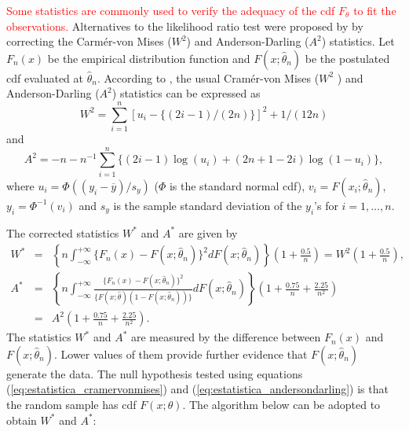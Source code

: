 \documentclass[10pt,letterpaper]{article}
\begin{document}
\textcolor{red}{Some statistics are commonly used to verify the adequacy of the cdf $F_\theta$ to fit the observations.} Alternatives to the likelihood ratio test were proposed by \cite{chen1995general} by correcting the Carm\'er-von Mises ($W^2$) and Anderson-Darling ($A^2$) statistics. Let $F_n(x)$ be the empirical distribution function and $F(x;\widehat \theta_n)$ be the postulated cdf evaluated at $\widehat \theta_n$.
According to \cite{chen1995general}, the usual Cram\'er-von Mises ($W^2$ ) and Anderson-Darling ($A^2$)
statistics can be expressed as
\begin{equation}\label{eq:w2}
W^2 = \sum_{i=1}^{n}[u_i - \{(2i-1)/(2n) \}]^2 + 1/(12n)
\end{equation}
and
\begin{equation}\label{eq:a2}
A^2 = -n - n^{-1}\sum_{i=1}^{n}\{(2i-1)\log(u_i) + (2n+1-2i)\log(1-u_i)\},
\end{equation}
where $u_i = \Phi((y_i-\overline{y})/s_y)$ ($\Phi$ is the standard normal cdf), $v_i = F(x_i; \widehat \theta_n)$, $y_i = \Phi^{-1}(v_i)$ and $s_y$ is the sample standard deviation of the $y_i$'s for $i=1,\ldots, n$.

The corrected statistics $W^*$ and $A^*$ are given by
\begin{eqnarray}
W^* &=& \left\{n \int_{-\infty}^{+\infty} \{F_n(x) - F(x;\widehat \theta_n)\}^2 dF(x;\widehat \theta_n)\right\}\left(1+\frac{0.5}{n}\right) = W^2\left(1+\frac{0.5}{n}\right) \label{eq:estatistica_cramervonmises},\\
A^* &=& \left\{n \int_{-\infty}^{+\infty} \frac{ \{F_n(x) - F(x;\widehat \theta_n) \}^2 }{ \{F(x;\widehat \theta)(1-F(x;\widehat \theta_n))\} }dF(x;\widehat \theta_n)\right\}\left(1 + \frac{0.75}{n} + \frac{2.25}{n^2}\right) \nonumber\\
&=& A^2 \left(1 + \frac{0.75}{n} + \frac{2.25}{n^2}\right). \label{eq:estatistica_andersondarling}
\end{eqnarray}
The statistics $W^*$ and $A^*$ are measured by the difference between $F_n(x)$ and $F(x;\widehat\theta_n)$. Lower values of them provide further evidence that $F(x;\widehat \theta_n)$ generate
the data. The null hypothesis tested using equations (\ref{eq:estatistica_cramervonmises}) and (\ref{eq:estatistica_andersondarling})
is that the random sample has cdf $F(x;\theta)$.  The algorithm below can be adopted to obtain $W^*$ and $A^*$:
\end{document}
